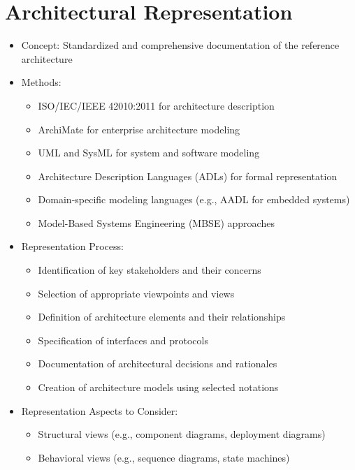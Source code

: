 \documentclass[12pt,a4paper]{article}
\begin{document}
\section{Architectural Representation}
\begin{itemize}
    \item Concept: Standardized and comprehensive documentation of the reference architecture
    \item Methods:
    \begin{itemize}
        \item ISO/IEC/IEEE 42010:2011 for architecture description \citep{ISO42010}
        \item ArchiMate for enterprise architecture modeling \citep{Lankhorst2017}
        \item UML and SysML for system and software modeling \citep{OMG2017}
        \item Architecture Description Languages (ADLs) for formal representation \citep{Medvidovic2000}
        \item Domain-specific modeling languages (e.g., AADL for embedded systems) \citep{Feiler2012}
        \item Model-Based Systems Engineering (MBSE) approaches \citep{Estefan2007}
    \end{itemize}
    \item Representation Process:
    \begin{itemize}
        \item Identification of key stakeholders and their concerns \citep{Rozanski2012}
        \item Selection of appropriate viewpoints and views \citep{Kruchten1995}
        \item Definition of architecture elements and their relationships
        \item Specification of interfaces and protocols
        \item Documentation of architectural decisions and rationales \citep{Tyree2005}
        \item Creation of architecture models using selected notations
    \end{itemize}
    \item Representation Aspects to Consider:
    \begin{itemize}
        \item Structural views (e.g., component diagrams, deployment diagrams)
        \item Behavioral views (e.g., sequence diagrams, state machines)

\end{itemize}
\end{itemize}
\end{document}

